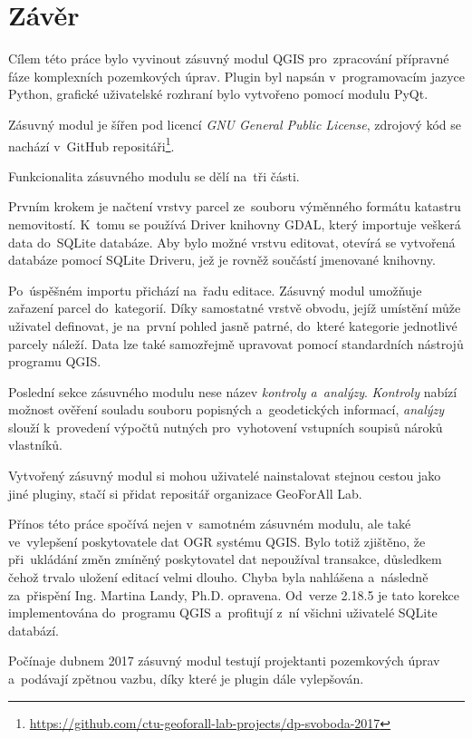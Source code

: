 \chapter{Závěr}
\label{zaver}

Cílem této práce bylo vyvinout zásuvný modul QGIS pro~zpracování
přípravné fáze komplexních pozemkových úprav. Plugin byl napsán
v~programovacím jazyce Python, grafické uživatelské rozhraní bylo
vytvořeno pomocí modulu PyQt.

Zásuvný modul je šířen pod licencí \textit{GNU General Public
License}, zdrojový kód se nachází v~GitHub
repositáři\footnote{\url{https://github.com/ctu-geoforall-lab-projects/dp-svoboda-2017}}.

Funkcionalita zásuvného modulu se dělí na~tři části.

Prvním krokem je načtení vrstvy parcel ze~souboru výměnného formátu
katastru nemovitostí. K~tomu se používá  Driver knihovny GDAL,
který importuje veš\-kerá data do~SQLite databáze. Aby bylo možné
vrstvu editovat, otevírá se vytvořená databáze pomocí SQLite Driveru,
jež je rovněž součástí jmenované knihovny.

Po~úspěšném importu přichází na~řadu editace. Zásuvný modul umožňuje
zařazení parcel do~kategorií. Díky samostatné vrstvě obvodu, jejíž
umístění může uživatel definovat, je na~první pohled jasně patrné,
do~které kategorie jednotlivé parcely náleží. Data lze také samozřejmě
upravovat pomocí standardních nástrojů programu QGIS.

Poslední sekce zásuvného modulu nese název \textit{kontroly
a~analýzy}. \textit{Kontroly} nabízí možnost ověření souladu souboru
popisných a~geodetických informací, \textit{analýzy} slouží
k~provedení výpočtů nutných pro~vyhotovení vstupních soupisů nároků
vlastníků.

Vytvořený zásuvný modul si mohou uživatelé nainstalovat stejnou cestou
jako jiné pluginy, stačí si přidat repositář organizace GeoForAll Lab.

Přínos této práce spočívá nejen v~samotném zásuvném modulu, ale také
ve~vylep\-šení poskytovatele dat OGR systému QGIS. Bylo totiž
zjištěno, že při~ukládání změn zmíněný poskytovatel dat nepoužíval
transakce, důsledkem čehož trvalo uložení editací velmi dlouho. Chyba
byla nahlášena a~následně za~přispění Ing. Martina Landy,
Ph.D. opravena. Od~verze 2.18.5 je tato korekce implementována
do~programu QGIS a~profitují z~ní všichni uživatelé SQLite databází.

Počínaje dubnem 2017 zásuvný modul testují projektanti pozemkových
úprav a~podávají zpětnou vazbu, díky které je plugin dále vylepšován.

